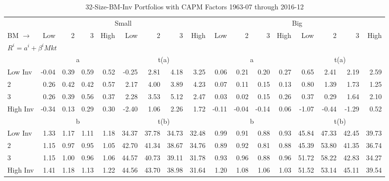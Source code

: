 
\begin{table}[!ht]
\centering
\caption{32-Size-BM-Inv Portfolios with CAPM Factors 1963-07 through 2016-12}
\begin{tabular}{lrrrrrrrrrrrrrrrr}
  \toprule
    & \multicolumn{8}{c}{Small} & \multicolumn{8}{c}{Big} \\
      \cmidrule(r){2-9} \cmidrule(r){10-17}
    BM $\rightarrow$ & Low & 2 & 3 & High & Low & 2 & 3 & High & Low & 2 & 3 & High & Low & 2 & 3 & High \\ 
  \midrule
  \multicolumn{17}{l}{$R^i=a^i+\beta^iMkt$} \\

  
    
      & \multicolumn{4}{c}{a} & \multicolumn{4}{c}{t(a)}
    
      & \multicolumn{4}{c}{a} & \multicolumn{4}{c}{t(a)}
    
    \\
      \cmidrule(r){2-5} \cmidrule(r){6-9} \cmidrule(r){10-13} \cmidrule(r){14-17}

    Low Inv   & -0.04  & 0.39  & 0.59  & 0.52  & -0.25  & 2.81  & 4.18  & 3.25  & 0.06  & 0.21  & 0.20  & 0.27  & 0.65  & 2.41  & 2.19  & 2.59  \\
           2  & 0.26  & 0.42  & 0.42  & 0.57  & 2.17  & 4.00  & 3.89  & 4.23  & 0.07  & 0.11  & 0.15  & 0.13  & 0.80  & 1.39  & 1.73  & 1.25  \\
           3  & 0.26  & 0.39  & 0.56  & 0.37  & 2.28  & 3.53  & 5.12  & 2.47  & 0.03  & 0.02  & 0.15  & 0.26  & 0.37  & 0.29  & 1.64  & 2.10  \\
    High Inv  & -0.34  & 0.13  & 0.29  & 0.30  & -2.40  & 1.06  & 2.26  & 1.72  & -0.11  & -0.04  & -0.14  & 0.06  & -1.07  & -0.44  & -1.29  & 0.52  \\

  
    
      & \multicolumn{4}{c}{b} & \multicolumn{4}{c}{t(b)}
    
      & \multicolumn{4}{c}{b} & \multicolumn{4}{c}{t(b)}
    
    \\
      \cmidrule(r){2-5} \cmidrule(r){6-9} \cmidrule(r){10-13} \cmidrule(r){14-17}

    Low Inv   & 1.33  & 1.17  & 1.11  & 1.18  & 34.37  & 37.78  & 34.73  & 32.48  & 0.99  & 0.91  & 0.88  & 0.93  & 45.84  & 47.33  & 42.45  & 39.73  \\
           2  & 1.15  & 0.97  & 0.95  & 1.05  & 42.70  & 41.34  & 38.67  & 34.76  & 0.89  & 0.92  & 0.81  & 0.88  & 45.39  & 53.80  & 41.35  & 36.74  \\
           3  & 1.15  & 1.00  & 0.96  & 1.06  & 44.57  & 40.73  & 39.11  & 31.78  & 0.93  & 0.96  & 0.88  & 0.96  & 51.72  & 58.22  & 42.83  & 34.27  \\
    High Inv  & 1.41  & 1.18  & 1.13  & 1.22  & 44.56  & 43.70  & 38.98  & 31.64  & 1.20  & 1.08  & 1.06  & 1.03  & 51.52  & 53.14  & 45.11  & 39.54  \\

  

  \bottomrule
\end{tabular}
\label{tbl:32_Size_BM_Inv_CAPM}
\end{table}
